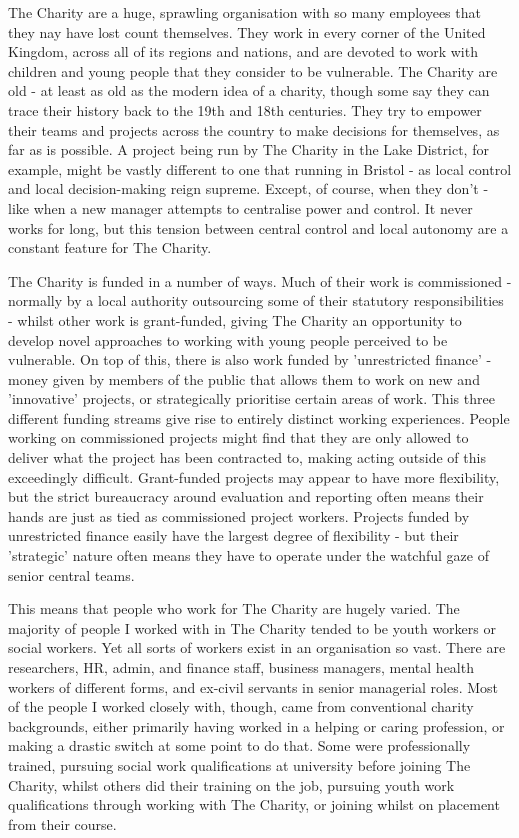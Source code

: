 The Charity are a huge, sprawling organisation with so many employees that they nay have lost count themselves. They work in every corner of the United Kingdom, across all of its regions and nations, and are devoted to work with children and young people that they consider to be vulnerable. The Charity are old - at least as old as the modern idea of a charity, though some say they can trace their history back to the 19th and 18th centuries. They try to empower their teams and projects across the country to make decisions for themselves, as far as is possible. A project being run by The Charity in the Lake District, for example, might be vastly different to one that running in Bristol - as local control and local decision-making reign supreme. Except, of course, when they don’t - like when a new manager attempts to centralise power and control. It never works for long, but this tension between central control and local autonomy are a constant feature for The Charity.

The Charity is funded in a number of ways. Much of their work is commissioned - normally by a local authority outsourcing some of their statutory responsibilities - whilst other work is grant-funded, giving The Charity an opportunity to develop novel approaches to working with young people perceived to be vulnerable. On top of this, there is also work funded by 'unrestricted finance' -  money given by members of the public that allows them to work on new and 'innovative' projects, or strategically prioritise certain areas of work. This three different funding streams give rise to entirely distinct working experiences. People working on commissioned projects might find that they are only allowed to deliver what the project has been contracted to, making acting outside of this exceedingly difficult. Grant-funded projects may appear to have more flexibility, but the strict bureaucracy around evaluation and reporting often means their hands are just as tied as commissioned project workers. Projects funded by unrestricted finance easily have the largest degree of flexibility - but their 'strategic' nature often means they have to operate under the watchful gaze of senior central teams. 

This means that people who work for The Charity are hugely varied. The majority of people I worked with in The Charity tended to be youth workers or social workers. Yet all sorts of workers exist in an organisation so vast. There are researchers, HR, admin, and finance staff, business managers, mental health workers of different forms, and ex-civil servants in senior managerial roles. Most of the people I worked closely with, though, came from conventional charity backgrounds, either primarily having worked in a helping or caring profession, or making a drastic switch at some point to do that. Some were professionally trained, pursuing social work qualifications at university before joining The Charity, whilst others did their training on the job, pursuing youth work qualifications through working with The Charity, or joining whilst on placement from their course. 

